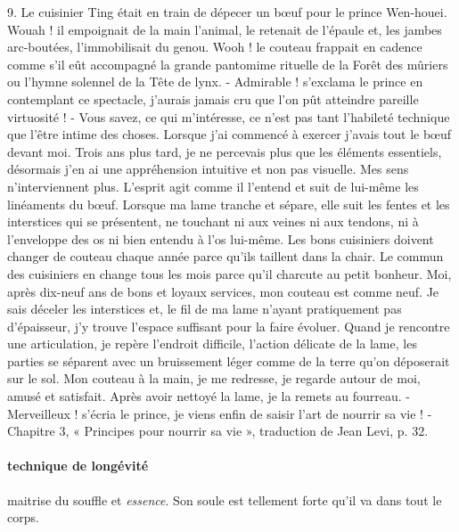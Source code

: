      
  \begin{singlequote}
      9. Le cuisinier Ting était en train de dépecer un bœuf pour le prince Wen-houei. Wouah ! il  empoignait de la main l’animal, le retenait de l’épaule et, les jambes arc-boutées, l’immobilisait du genou. Wooh ! le couteau frappait en cadence comme s’il eût accompagné la grande pantomime rituelle de la Forêt des mûriers ou l’hymne solennel de la Tête de lynx. - Admirable ! s’exclama le prince en contemplant ce spectacle, j’aurais jamais cru que l’on pût atteindre pareille virtuosité ! - Vous savez, ce qui m’intéresse, ce n’est pas tant l’habileté technique que l’être intime des choses. Lorsque j’ai commencé à exercer j’avais tout le bœuf devant moi. Trois ans plus tard, je ne percevais plus que les éléments essentiels, désormais j’en ai une appréhension intuitive et non pas visuelle. Mes sens n’interviennent plus. L’esprit agit comme il l’entend et suit de lui-même les linéaments du bœuf. Lorsque ma lame tranche et sépare, elle suit les fentes et les interstices qui se présentent, ne touchant ni aux veines ni aux tendons, ni à l’enveloppe des os ni bien entendu à l’os lui-même. Les bons cuisiniers doivent changer de couteau chaque année parce qu’ils taillent dans la chair. Le commun des cuisiniers en change tous les mois parce qu’il charcute au petit bonheur. Moi, après dix-neuf ans de bons et loyaux services, mon couteau est comme neuf. Je sais déceler les interstices et, le fil de ma lame n’ayant pratiquement pas d’épaisseur, j’y trouve l’espace suffisant pour la faire évoluer. Quand je rencontre une articulation, je repère l’endroit difficile, l’action délicate de la lame, les parties se séparent avec un bruissement léger comme de la terre qu’on déposerait sur le sol. Mon couteau à la main, je me redresse, je regarde autour de moi, amusé et satisfait. Après avoir nettoyé la lame, je la remets au fourreau.  - Merveilleux ! s’écria le prince, je viens enfin de saisir l’art de nourrir sa vie !  - Chapitre 3, « Principes pour nourrir sa vie », traduction de Jean Levi, p. 32.
  \end{singlequote}
 
  \paragraph{technique de longévité} maitrise du souffle et \textit{essence}. Son soule est tellement forte qu'il va dans tout le corps.
  